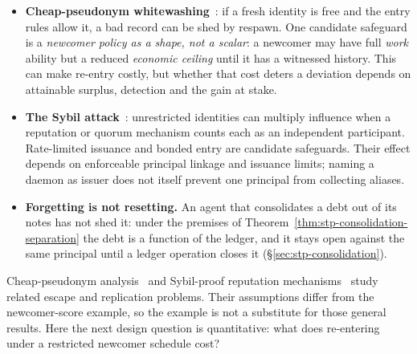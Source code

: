 \documentclass[11pt,a4paper]{article}
\theoremstyle{definition}
\begin{document}
\begin{itemize}[leftmargin=1.4em]
  \item \textbf{Cheap-pseudonym whitewashing}~: if a
  fresh identity is free and the entry rules allow it, a bad record can be shed by respawn. One candidate safeguard is a
  \emph{newcomer policy as a shape, not a scalar}: a newcomer may have full
  \emph{work} ability but a reduced \emph{economic ceiling} until it has a
  witnessed history. This can make re-entry costly, but whether that cost deters a deviation depends on attainable surplus, detection and the gain at stake.
  \item \textbf{The Sybil attack}~: unrestricted identities can multiply influence when a
  reputation or quorum mechanism counts each as an independent participant. Rate-limited issuance and bonded entry are candidate safeguards. Their effect depends on enforceable principal linkage and issuance limits; naming a daemon as issuer does not itself prevent one principal from collecting aliases.
  \item \textbf{Forgetting is not resetting.} An agent that consolidates a debt out of its notes has not shed it: under the premises of Theorem~\ref{thm:stp-consolidation-separation} the debt is a function of the ledger, and it stays open against the same principal until a ledger operation closes it (\S\ref{sec:stp-consolidation}).
\end{itemize}

Cheap-pseudonym analysis~ and Sybil-proof reputation mechanisms~ study related escape and replication problems. Their assumptions differ from the newcomer-score example, so the example is not a substitute for those general results. Here the next design question is quantitative: what does re-entering under a restricted newcomer schedule cost?
\end{document}
